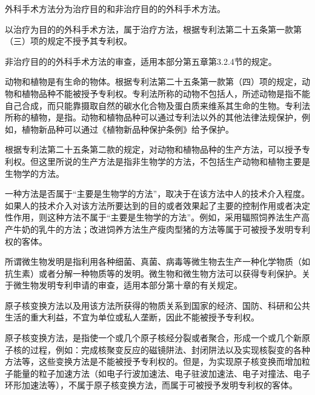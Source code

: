 {\setlength{\parindent}{22.2bp}外科手术方法分为治疗目的和非治疗目的的外科手术方法。\par}

以治疗为目的的外科手术方法，属于治疗方法，根据专利法第二十五条第一款第（三）项的规定不授予其专利权。

非治疗目的的外科手术方法的审查，适用本部分第五章第3.2.4节的规定。

动物和植物是有生命的物体。根据专利法第二十五条第一款第（四）项的规定，动物和植物品种不能被授予专利权。专利法所称的动物不包括人，所述动物是指不能自己合成，而只能靠摄取自然的碳水化合物及蛋白质来维系其生命的生物。专利法所称的植物，是指。动物和植物品种可以通过专利法以外的其他法律法规保护，例如，植物新品种可以通过《植物新品种保护条例》给予保护。

根据专利法第二十五条第二款的规定，对动物和植物品种的生产方法，可以授予专利权。但这里所说的生产方法是指非生物学的方法，不包括生产动物和植物主要是生物学的方法。

一种方法是否属于“主要是生物学的方法”，取决于在该方法中人的技术介入程度。如果人的技术介入对该方法所要达到的目的或者效果起了主要的控制作用或者决定性作用，则这种方法不属于“主要是生物学的方法”。例如，采用辐照饲养法生产高产牛奶的乳牛的方法；改进饲养方法生产瘦肉型猪的方法等属于可被授予发明专利权的客体。

所谓微生物发明是指利用各种细菌、真菌、病毒等微生物去生产一种化学物质（如抗生素）或者分解一种物质等的发明。微生物和微生物方法可以获得专利保护。关于微生物发明专利申请的审查，适用本部分第十章的有关规定。

原子核变换方法以及用该方法所获得的物质关系到国家的经济、国防、科研和公共生活的重大利益，不宜为单位或私人垄断，因此不能被授予专利权。

原子核变换方法，是指使一个或几个原子核经分裂或者聚合，形成一个或几个新原子核的过程，例如：完成核聚变反应的磁镜阱法、封闭阱法以及实现核裂变的各种方法等，这些变换方法是不能被授予专利权的。但是，为实现原子核变换而增加粒子能量的粒子加速方法（如电子行波加速法、电子驻波加速法、电子对撞法、电子环形加速法等），不属于原子核变换方法，而属于可被授予发明专利权的客体。

